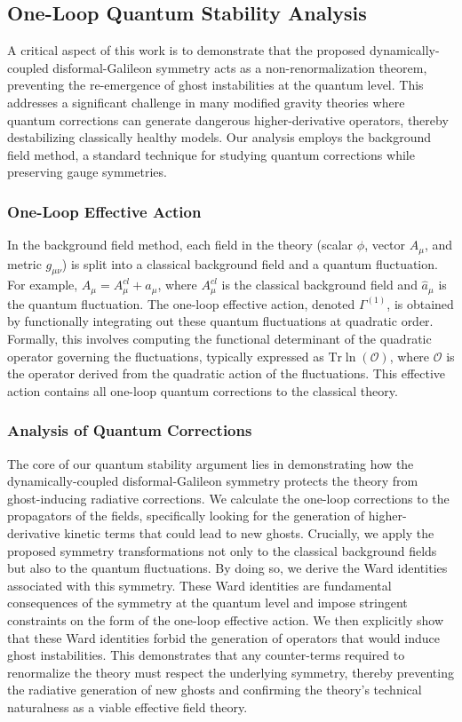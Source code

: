 \documentclass[twocolumn]{aastex631}
\begin{document}
\subsection{One-Loop Quantum Stability Analysis}

A critical aspect of this work is to demonstrate that the proposed dynamically-coupled disformal-Galileon symmetry acts as a non-renormalization theorem, preventing the re-emergence of ghost instabilities at the quantum level. This addresses a significant challenge in many modified gravity theories where quantum corrections can generate dangerous higher-derivative operators, thereby destabilizing classically healthy models. Our analysis employs the background field method, a standard technique for studying quantum corrections while preserving gauge symmetries.

\subsubsection{One-Loop Effective Action}
In the background field method, each field in the theory (scalar $\phi$, vector $A_\mu$, and metric $g_{\mu\nu}$) is split into a classical background field and a quantum fluctuation. For example, $A_\mu = A_\mu^{cl} + \hat{a}_\mu$, where $A_\mu^{cl}$ is the classical background field and $\hat{a}_\mu$ is the quantum fluctuation. The one-loop effective action, denoted $\Gamma^{(1)}$, is obtained by functionally integrating out these quantum fluctuations at quadratic order. Formally, this involves computing the functional determinant of the quadratic operator governing the fluctuations, typically expressed as $\text{Tr} \ln(\mathcal{O})$, where $\mathcal{O}$ is the operator derived from the quadratic action of the fluctuations. This effective action contains all one-loop quantum corrections to the classical theory.

\subsubsection{Analysis of Quantum Corrections}
The core of our quantum stability argument lies in demonstrating how the dynamically-coupled disformal-Galileon symmetry protects the theory from ghost-inducing radiative corrections. We calculate the one-loop corrections to the propagators of the fields, specifically looking for the generation of higher-derivative kinetic terms that could lead to new ghosts. Crucially, we apply the proposed symmetry transformations not only to the classical background fields but also to the quantum fluctuations. By doing so, we derive the Ward identities associated with this symmetry. These Ward identities are fundamental consequences of the symmetry at the quantum level and impose stringent constraints on the form of the one-loop effective action. We then explicitly show that these Ward identities forbid the generation of operators that would induce ghost instabilities. This demonstrates that any counter-terms required to renormalize the theory must respect the underlying symmetry, thereby preventing the radiative generation of new ghosts and confirming the theory's technical naturalness as a viable effective field theory.
\end{document}
